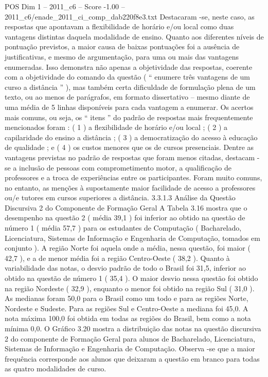 \begin{textsample}{POS Dim 1 – 2011\_c6 – Score -1.00 – 2011\_c6/enade\_2011\_ci\_comp\_dab220f8e3.txt}
Destacaram -se, neste caso, as respostas que apontavam a flexibilidade de horário e/ou local como duas vantagens distintas daquela modalidade de ensino.
Quanto aos diferentes níveis de pontuação previstos, a maior causa de baixas pontuações foi a ausência de justificativas, e mesmo de argumentação, para uma ou mais das vantagens enumeradas.
Isso demonstra não apenas a objetividade das respostas, coerente com a objetividade do comando da questão ( “ enumere três vantagens de um curso a distância ” ), mas também certa dificuldade de formulação plena de um texto, ou ao menos de parágrafos, em formato dissertativo – mesmo diante de uma média de 5 linhas disponíveis para cada vantagem a enumerar.
Os acertos mais comuns, ou seja, os “ itens ” do padrão de respostas mais frequentemente mencionados foram : ( 1 ) a flexibilidade de horário e/ou local ; ( 2 ) a capilaridade do ensino a distância ; ( 3 ) a democratização do acesso à educação de qualidade ; e ( 4 ) os custos menores que os de cursos presenciais.
Dentre as vantagens previstas no padrão de respostas que foram menos citadas, destacam -se a inclusão de pessoas com comprometimento motor, a qualificação de professores e a troca de experiências entre os participantes.
Foram muito comuns, no entanto, as menções à supostamente maior facilidade de acesso a professores ou/e tutores em cursos superiores a distância. 3.3.1.3 Análise da Questão Discursiva 2 do Componente de Formação Geral A Tabela 3.16 mostra que o desempenho na questão 2 ( média 39,1 ) foi inferior ao obtido na questão de número 1 ( média 57,7 ) para os estudantes de Computação ( Bacharelado, Licenciatura, Sistemas de Informação e Engenharia de Computação, tomados em conjunto ).
A região Norte foi aquela onde a média, nessa questão, foi maior ( 42,7 ), e a de menor média foi a região Centro-Oeste ( 38,2 ).
Quanto à variabilidade das notas, o desvio padrão de todo o Brasil foi 31,5, inferior ao obtido na questão de número 1 ( 35,4 ).
O maior desvio nessa questão foi obtido na região Nordeste ( 32,9 ), enquanto o menor foi obtido na região Sul ( 31,0 ).
As medianas foram 50,0 para o Brasil como um todo e para as regiões Norte, Nordeste e Sudeste.
Para as regiões Sul e Centro-Oeste a mediana foi 45,0.
A nota máxima 100,0 foi obtida em todas as regiões do Brasil, bem como a nota mínima 0,0.
O Gráfico 3.20 mostra a distribuição das notas na questão discursiva 2 do componente de Formação Geral para alunos de Bacharelado, Licenciatura, Sistemas de Informação e Engenharia de Computação.
Observa -se que a maior frequência corresponde aos alunos que deixaram a questão em branco para todas as quatro modalidades de curso.

\end{textsample}
